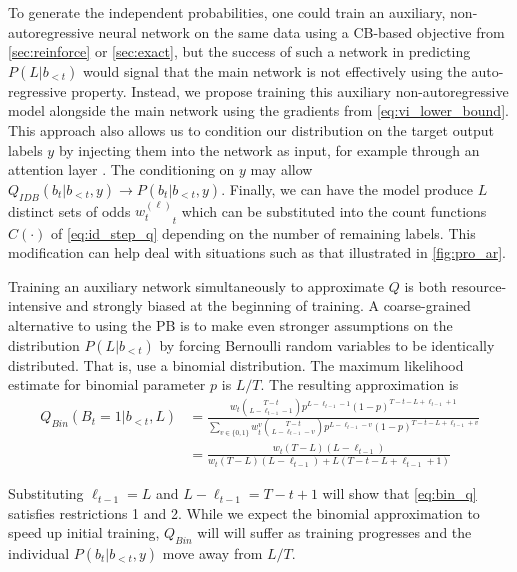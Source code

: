 \documentclass{article}
\begin{document}
To generate the independent probabilities, one could train an auxiliary,
non-autoregressive neural network on the same data using a CB-based objective
from \cref{sec:reinforce} or \cref{sec:exact}, but the success of such a
network in predicting $P(L|b_{<t})$ would signal that the main network is not
effectively using the auto-regressive property. Instead, we propose training
this auxiliary non-autoregressive model alongside the main network using the
gradients from \cref{eq:vi_lower_bound}. This approach also allows us to
condition our distribution on the target output labels $y$ by injecting them
into the network as input, for example through an attention layer
\cite{bahdanauNeuralMachineTranslation2015}. The conditioning on $y$ may allow
$Q_{IDB}(b_t|b_{<t}, y) \to P(b_t|b_{<t}, y)$. Finally, we can have the model
produce $L$ distinct sets of odds ${w^{(\ell)}_t}_t$ which can be substituted
into the count functions $C(\cdot)$ of \cref{eq:id_step_q} depending on the
number of remaining labels. This modification can help deal with situations
such as that illustrated in \cref{fig:pro_ar}.

Training an auxiliary network simultaneously to approximate $Q$ is both
resource-intensive and strongly biased at the beginning of training. A
coarse-grained alternative to using the PB is to make even stronger assumptions
on the distribution $P(L|b_{<t})$ by forcing Bernoulli random variables to be
identically distributed. That is, use a binomial distribution. The maximum
likelihood estimate for binomial parameter $p$ is $L / T$. The resulting
approximation is
%
\begin{equation} \label{eq:bin_q}
\begin{split}
Q_{Bin}(B_t=1|b_{<t}, L)
    &= \frac{
            w_t \binom{T - t}{L - \ell_{t-1} - 1} p^{L - \ell_{t - 1} - 1}
            (1 - p)^{T - t - L + \ell_{t-1} + 1}}
        {\sum_{v \in \{0,1\}}
            w_t^v \binom{T - t}{L - \ell_{t-1} - v}p^{L - \ell_{t-1} - v}
            (1 - p)^{T - t - L + \ell_{t-1} + v}} \\
    &= \frac{w_t (T - L)(L - \ell_{t-1})}
            {w_t (T - L)(L - \ell_{t-1}) + L(T - t - L + \ell_{t-1} + 1)}
\end{split}
\end{equation}

Substituting $\ell_{t-1} = L$ and $L - \ell_{t-1} = T - t + 1$ will show that
\cref{eq:bin_q} satisfies restrictions 1 and 2. While we expect the binomial
approximation to speed up initial training, $Q_{Bin}$ will will suffer as
training progresses and the individual $P(b_t|b_{<t}, y)$ move away from $L /
T$.
\end{document}
